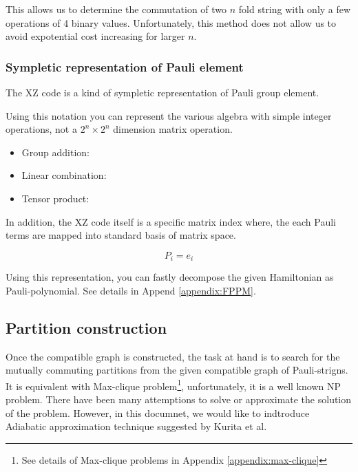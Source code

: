 This allows us to determine the commutation of two $n$ fold string with only a few 
operations of 4 binary values. 
Unfortunately, this method does not allow us to avoid expotential 
cost increasing for larger $n$.

\subsubsection{Sympletic representation of Pauli element}

The XZ code is a kind of sympletic representation of Pauli group 
element.

Using this notation you can represent 
the various algebra with simple integer operations,
not a $2^n \times 2^n$ dimension matrix operation.

\begin{itemize}
    \item Group addition:
    \item Linear combination:
    \item Tensor product:
\end{itemize}

In addition, the XZ code itself is a specific matrix index 
where, the each Pauli terms are mapped into standard basis of matrix space.

\begin{equation}
    P_i = e_i
\end{equation}

Using this representation, you can fastly decompose the 
given Hamiltonian as Pauli-polynomial. See details in Append \ref{appendix:FPPM}.

\subsection{Partition construction}

Once the compatible graph is constructed, the task at hand is to search for the 
mutually commuting partitions from the given compatible graph of Pauli-strigns.
It is equivalent with Max-clique problem\footnote[3]{See details of Max-clique problems in Appendix \ref{appendix:max-clique}}, 
unfortunately, it is a well known NP problem\cite{miller_reducibility_1972}.
There have been many attemptions to solve or approximate the solution of the problem.
However, in this documnet, we would like to indtroduce 
Adiabatic approximation technique suggested by Kurita et al\cite{kurital_2023}.

